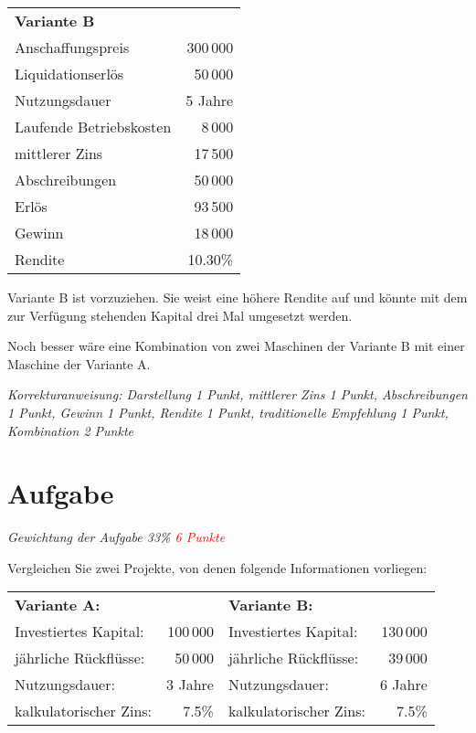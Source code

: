 \begin{tabular}[H]{lr}
  \multicolumn{2}{l}{\textbf{Variante B}}\\
  Anschaffungspreis&300\,000\\
  Liquidationserlös&50\,000\\
  Nutzungsdauer&5 Jahre\\
  Laufende Betriebskosten&8\,000\\
  mittlerer Zins&17\,500\\
  Abschreibungen&50\,000\\
  Erlös&93\,500\\
  Gewinn&18\,000\\
  Rendite&10.30\%\\
\end{tabular}

Variante B ist vorzuziehen. Sie weist eine höhere Rendite auf und könnte
mit dem zur Verfügung stehenden Kapital drei Mal umgesetzt werden.

Noch besser wäre eine Kombination von zwei Maschinen der Variante B mit
einer Maschine der Variante A.

\itshape
Korrekturanweisung: Darstellung 1 Punkt, mittlerer Zins 1 Punkt,
Abschreibungen 1 Punkt, Gewinn 1 Punkt, Rendite 1 Punkt, traditionelle
Empfehlung 1 Punkt, Kombination 2 Punkte
\normalfont

\color{black}

\section{Aufgabe}
\textit{Gewichtung der Aufgabe 33\% \textcolor{red}{6 Punkte}}

Vergleichen Sie zwei Projekte, von denen folgende Informationen
vorliegen:

\vspace{3mm}

\begin{tabular}[H]{lrlr}
  \multicolumn{2}{l}{\textbf{Variante A:}}&\multicolumn{2}{l}{\textbf{Variante B:}}\\
  Investiertes Kapital:&100\,000&          Investiertes Kapital:&130\,000\\
  jährliche Rückflüsse:&50\,000&           jährliche Rückflüsse:&39\,000\\
  Nutzungsdauer:&3 Jahre&                  Nutzungsdauer:&6 Jahre\\
  kalkulatorischer Zins:&7.5\%&            kalkulatorischer Zins:&7.5\%\\
\end{tabular}

